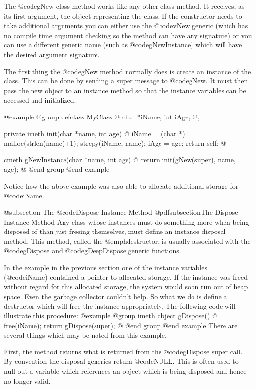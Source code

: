 The @code{gNew} class method works like any other class method.  It
receives, as its first argument, the object representing the class.
If the constructor needs to take additional arguments you can either
use the @code{vNew} generic (which has no compile time argument checking
so the method can have any signature) or you can use a different generic name
(such as @code{gNewInstance}) which will have the desired argument
signature.

The first thing the @code{gNew} method normally does is create an
instance of the class.  This can be done by sending a super message to
@code{gNew}.  It must then pass the new object to an instance method
so that the instance variables can be accessed and initialized.

@example
@group
defclass  MyClass  @{
        char    *iName;
        int     iAge;
@};

private imeth  init(char *name, int age)
@{
        iName = (char *) malloc(strlen(name)+1);
        strcpy(iName, name);
        iAge = age;
        return self;
@}

cmeth  gNewInstance(char *name, int age)
@{
        return init(gNew(super), name, age);
@}
@end group
@end example

Notice how the above example was also able to allocate additional storage
for @code{iName}.


@subsection The @code{Dispose} Instance Method
@pdfsubsection{The Dispose Instance Method}
Any class whose instances must do something more when being disposed of
than just freeing themselves, must define an instance disposal method.
This method, called the @emph{destructor}, is usually associated with
the @code{gDispose} and @code{gDeepDispose} generic functions.

In the example in the previous section one of the instance variables
(@code{iName}) contained a pointer to allocated storage.  If the instance
was freed without regard for this allocated storage, the system would
soon run out of heap space.  Even the garbage collector couldn't help.
So what we do is define a destructor which will free the instance
appropriately.  The following code will illustrate this procedure:
@example
@group
imeth   object    gDispose()
@{
        free(iName);
        return gDispose(super);
@}
@end group
@end example
There are several things which may be noted from this example.

First, the method returns what is returned from the @code{gDispose}
super call.   By convention the disposal generics return @code{NULL}.
This is often used to null out a variable which references an object
which is being disposed and hence no longer valid.

